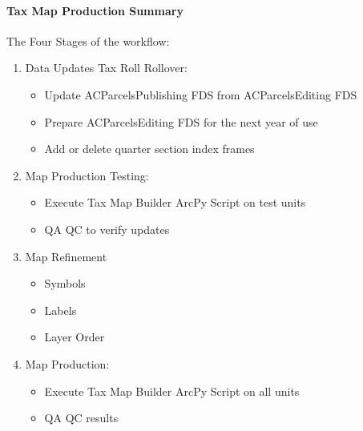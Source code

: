 \paragraph{Tax Map Production Summary}
\vspace{.25in}

The {\LARGE Four Stages} of the workflow:
\vspace{.25in}

\begin{enumerate}
\item {\Large Data Updates} {\normalsize Tax Roll Rollover}:
\begin{itemize}
\item Update ACParcelsPublishing FDS from ACParcelsEditing FDS
\item Prepare ACParcelsEditing FDS for the next year of use
\item Add or delete quarter section index frames
\end{itemize}
\item {\Large Map Production Testing:}
\begin{itemize}
\item Execute Tax Map Builder ArcPy Script on test units
\item QA QC to verify updates
\end{itemize}
\item {\Large Map Refinement}
\begin{itemize}
\item Symbols
\item Labels
\item Layer Order
\end{itemize}
\item {\Large Map Production:}
\begin{itemize}
\item Execute Tax Map Builder ArcPy Script on all units
\item QA QC results
\end{itemize}
\end{enumerate}
\clearpage
